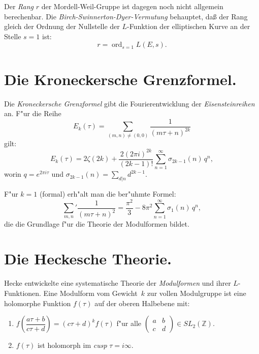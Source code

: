 \documentclass[12pt,a4paper]{article}
\theoremstyle{definition}
\begin{document}
Der \emph{Rang} $r$ der Mordell-Weil-Gruppe ist dagegen noch nicht allgemein berechenbar. Die \emph{Birch-Swinnerton-Dyer-Vermutung} behauptet, da\ss{}{} der Rang gleich der Ordnung der Nullstelle der $L$-Funktion der elliptischen Kurve an der Stelle $s=1$ ist:
\begin{equation}\tag{1}
r = \operatorname{ord}_{s=1}L(E,s).
\end{equation}

\newpage

\section{Die Kroneckersche Grenzformel.}

Die \emph{Kroneckersche Grenzformel} gibt die Fourierentwicklung der \emph{Eisensteinreihen} an. F"ur die Reihe
\begin{equation}\tag{1}
E_k(\tau) = \sum_{(m,n)\neq(0,0)} \frac{1}{(m\tau+n)^{2k}}
\end{equation}
gilt:
\begin{equation}\tag{2}
E_k(\tau) = 2\zeta(2k) + \frac{2(2\pi i)^{2k}}{(2k-1)!}\sum_{n=1}^\infty \sigma_{2k-1}(n)\,q^n,
\end{equation}
worin $q = e^{2\pi i\tau}$ und $\sigma_{2k-1}(n) = \sum_{d|n} d^{2k-1}$.

F"ur $k=1$ (formal) erh"alt man die ber"uhmte Formel:
\begin{equation}\tag{3}
\sum_{m,n}'\frac{1}{(m\tau+n)^2} = \frac{\pi^2}{3} - 8\pi^2\sum_{n=1}^\infty \sigma_1(n)\,q^n,
\end{equation}
die die Grundlage f"ur die Theorie der Modulformen bildet.

\newpage

\section{Die Heckesche Theorie.}

Hecke entwickelte eine systematische Theorie der \emph{Modulformen} und ihrer $L$-Funktionen. Eine Modulform vom Gewicht~$k$ zur vollen Modulgruppe ist eine holomorphe Funktion $f(\tau)$ auf der oberen Halbebene mit:
\begin{enumerate}[label=\arabic*.]
\item $f\left(\dfrac{a\tau+b}{c\tau+d}\right) = (c\tau+d)^k f(\tau)$ f"ur alle $\begin{pmatrix}a&b\\c&d\end{pmatrix} \in SL_2(\mathbb{Z})$.
\item $f(\tau)$ ist holomorph im \emph{cusp} $\tau = i\infty$.
\end{enumerate}
\end{document}
